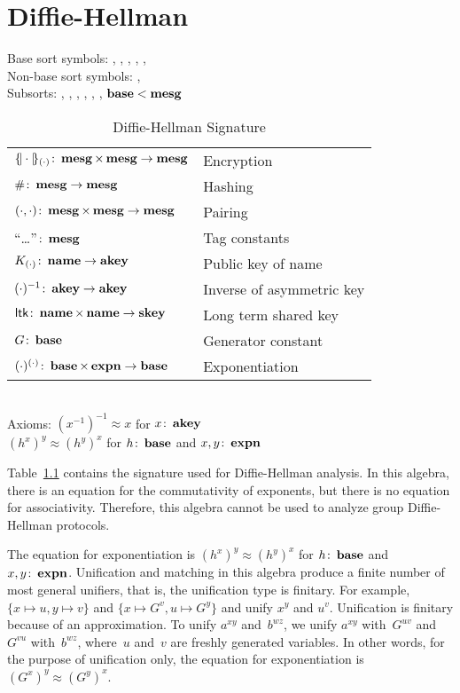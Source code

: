 \documentclass[12pt]{report}
\theoremstyle{definition}
\newcommand{\gen}{\ensuremath{G}}
\begin{document}
\chapter{Diffie-Hellman}

\begin{table}
\begin{center}
Base sort symbols: , , , ,
, \\
Non-base sort symbols: ,  \\[1ex]
Subsorts: , , , , ,
, $\operatorname{\mathbf{base}}<\operatorname{\mathbf{mesg}}$\\[1ex]
\begin{tabular}{@{}ll}
$\{\!|\cdot|\!\}_{(\cdot)}\colon\operatorname{\mathbf{mesg}}\times\operatorname{\mathbf{mesg}}\rightarrow\operatorname{\mathbf{mesg}}$
&Encryption\\
$\#\colon\operatorname{\mathbf{mesg}}\rightarrow\operatorname{\mathbf{mesg}}$
&Hashing\\
$(\cdot,\cdot)\colon\operatorname{\mathbf{mesg}}\times\operatorname{\mathbf{mesg}}\rightarrow\operatorname{\mathbf{mesg}}$
&Pairing\\
``\ldots''$\colon\operatorname{\mathbf{mesg}}$& Tag constants\\
$K_{(\cdot)}\colon\operatorname{\mathbf{name}}\rightarrow\operatorname{\mathbf{akey}}$
&Public key of name\\
$(\cdot)^{-1}\colon\operatorname{\mathbf{akey}}\rightarrow\operatorname{\mathbf{akey}}$
&Inverse of asymmetric key\\
$\operatorname{\mathsf{ltk}}\colon\operatorname{\mathbf{name}}\times\operatorname{\mathbf{name}}\rightarrow\operatorname{\mathbf{skey}}$
& Long term shared key\\
$\gen\colon\dom{base}$
& Generator constant\\
$(\cdot)^{(\cdot)}\colon\operatorname{\mathbf{base}}\times\operatorname{\mathbf{expn}}\rightarrow\operatorname{\mathbf{base}}$
& Exponentiation
\end{tabular}\\[1ex]
Axioms: $(x^{-1})^{-1}\approx x$ for $x\colon\operatorname{\mathbf{akey}}$\\
$(h^x)^y\approx (h^y)^x$ for $h\colon\operatorname{\mathbf{base}}$ and
$x,y\colon\operatorname{\mathbf{expn}}$\\[1ex]
\caption{Diffie-Hellman Signature}\label{tab:dh}
\end{center}
\end{table}

Table~\ref{tab:dh} contains the signature used for Diffie-Hellman
analysis.  In this algebra, there is an equation for the commutativity
of exponents, but there is no equation for associativity.  Therefore,
this algebra cannot be used to analyze group Diffie-Hellman protocols.

The equation for exponentiation is $(h^x)^y\approx (h^y)^x$ for
$h\colon\operatorname{\mathbf{base}}$ and $x,y\colon\operatorname{\mathbf{expn}}$.  Unification and
matching in this algebra produce a finite number of most general
unifiers, that is, the unification type is finitary.  For example,
$\{x\mapsto u,y\mapsto v\}$ and $\{x\mapsto \gen^v,u\mapsto \gen^y\}$
and unify $x^y$ and $u^v$.  Unification is finitary because of an
approximation.  To unify $a^{xy}$ and~$b^{wz}$, we unify $a^{xy}$
with~$\gen^{uv}$ and $\gen^{vu}$ with~$b^{wz}$, where~$u$ and~$v$ are
freshly generated variables.  In other words, for the purpose of
unification only, the equation for exponentiation is
$(\gen^x)^y\approx (\gen^y)^x$.




\printindex
\end{document}
